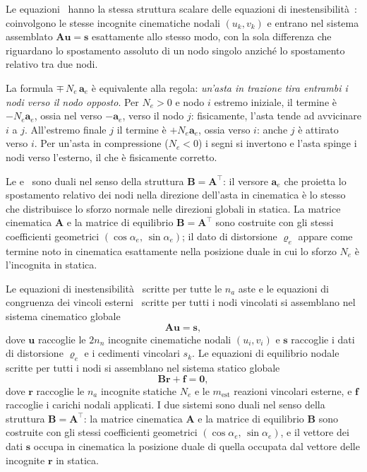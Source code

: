 Le equazioni~ hanno
la stessa struttura scalare delle equazioni di
inestensibilità~: coinvolgono
le stesse incognite cinematiche nodali $(u_k, v_k)$ e
entrano nel sistema assemblato $\bm{A}\bm{u} = \bm{s}$
esattamente allo stesso modo, con la sola differenza
che riguardano lo spostamento assoluto di un nodo
singolo anziché lo spostamento relativo tra due nodi.



\begin{oss}
	La formula $\mp\, N_e\, \bm{a}_e$ è equivalente
	alla regola: \emph{un'asta in trazione tira entrambi
		i nodi verso il nodo opposto}. Per $N_e > 0$ e nodo
	$i$ estremo iniziale, il termine è $-N_e\mathbf{a}_e$,
	ossia nel verso $-\bm{a}_e$, verso il nodo $j$:
	fisicamente, l'asta tende ad avvicinare $i$ a $j$.
	All'estremo finale $j$ il termine è $+N_e\mathbf{a}_e$,
	ossia verso $i$: anche $j$ è attirato verso $i$.
	Per un'asta in compressione ($N_e < 0$) i segni
	si invertono e l'asta spinge i nodi verso l'esterno,
	il che è fisicamente corretto.
\end{oss}

\begin{oss}[Dualità cinematica--statica:
	$\bm{B} = \bm{A}^\top$]
	Le 
	e~ sono duali nel
	senso della struttura $\bm{B} = \bm{A}^\top$:
	il versore $\bm{a}_e$ che proietta lo spostamento
	relativo dei nodi nella direzione dell'asta in
	cinematica è lo stesso che distribuisce lo sforzo
	normale nelle direzioni globali in statica.
	La matrice cinematica $\bm{A}$ e la matrice di
	equilibrio $\bm{B} = \bm{A}^\top$ sono costruite
	con gli stessi coefficienti geometrici
	$(\cos\alpha_e,\, \sin\alpha_e)$; il dato di
	distorsione $\varrho_e$ appare come termine noto
	in cinematica esattamente nella posizione duale in
	cui lo sforzo $N_e$ è l'incognita in statica.
\end{oss}


Le equazioni di inestensibilità~
scritte per tutte le $n_a$ aste e le equazioni di
congruenza dei vincoli esterni~
scritte per tutti i nodi vincolati si assemblano nel
sistema cinematico globale
\[
\bm{A}\bm{u} = \bm{s},
\]
dove $\bm{u}$ raccoglie le $2n_n$ incognite cinematiche
nodali $(u_i, v_i)$ e $\bm{s}$ raccoglie i dati di
distorsione $\varrho_e$ e i cedimenti vincolari $s_k$.
Le equazioni di equilibrio nodale~
scritte per tutti i nodi si assemblano nel sistema
statico globale
\[
\bm{B}\bm{r} + \bm{f} = \bm{0},
\]
dove $\bm{r}$ raccoglie le $n_a$ incognite statiche
$N_e$ e le $m_\text{est}$ reazioni vincolari esterne,
e $\bm{f}$ raccoglie i carichi nodali applicati.
I due sistemi sono duali nel senso della struttura
$\bm{B} = \bm{A}^\top$: la matrice cinematica $\bm{A}$
e la matrice di equilibrio $\bm{B}$ sono costruite con
gli stessi coefficienti geometrici $(\cos\alpha_e,\,
\sin\alpha_e)$, e il vettore dei dati $\bm{s}$ occupa
in cinematica la posizione duale di quella occupata
dal vettore delle incognite $\bm{r}$ in statica.



